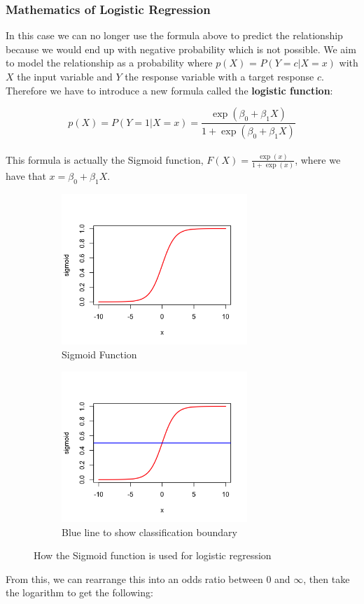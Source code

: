 \documentclass[11pt,a4paper]{report}
\begin{document}
\subsubsection{Mathematics of Logistic Regression}
In this case we can no longer use the formula above to predict the relationship because we would end up with negative probability which is not possible.
We aim to model the relationship as a probability where $p(X)$ = $P(Y = c|X = x)$ with $X$ the input variable and $Y$ the response variable with a target response $c$. \cite{CMULR}
Therefore we have to introduce a new formula called the \textbf{logistic function}:

\[p(X) = P(Y = 1|X = x) = \frac{\exp(\beta_0 + \beta_1X)}{1 + \exp(\beta_0 + \beta_1X)}\]\\
This formula is actually the Sigmoid function, $F(X) = \frac{\exp(x)}{1 + \exp(x)}$, where we have that $x = \beta_0 + \beta_1X$.

\begin{figure}[ht]
\centering
\begin{subfigure}{.5\textwidth}
  \centering
  \includegraphics[width=7cm]{photographs/sigmoid.png}
  \caption{Sigmoid Function}
  \label{fig:sub1}
\end{subfigure}%
\begin{subfigure}{.5\textwidth}
  \centering
  \includegraphics[width=7cm]{photographs/sigmoidline.png}
  \caption{Blue line to show classification boundary}
  \label{fig:sub2}
\end{subfigure}
\caption{How the Sigmoid function is used for logistic regression}
\label{fig:2}
\end{figure}
From this, we can rearrange this into an odds ratio between 0 and $\infty$, then take the logarithm to get the following:
\end{document}

